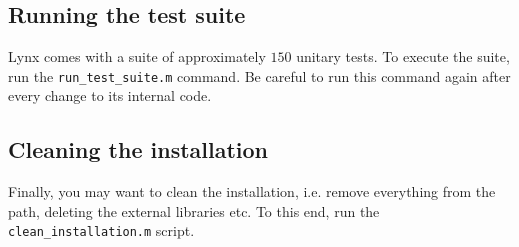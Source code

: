 \subsection{Running the test suite}

Lynx comes with a suite of approximately $150$ unitary tests. To execute the suite, run the \verb|run_test_suite.m| command. Be careful to run this command again after every change to its internal code.

\subsection{Cleaning the installation}

Finally, you may want to clean the installation, i.e. remove everything from the path, deleting the external libraries etc. To this end, run the \verb|clean_installation.m| script.